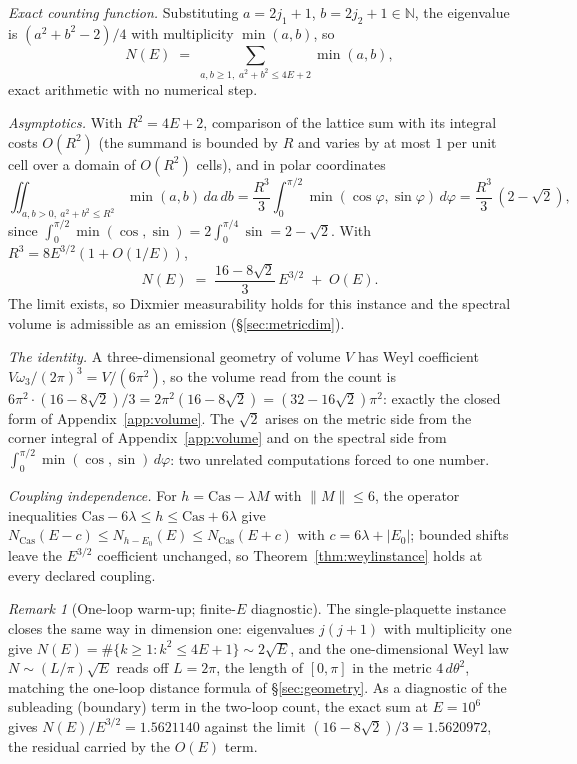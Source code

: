 \documentclass[11pt]{article}
\theoremstyle{definition}
\theoremstyle{remark}
\newtheorem{remark}[theorem]{Remark}
\begin{document}
\emph{Exact counting function.}  Substituting $a = 2j_1{+}1$,
$b = 2j_2{+}1 \in \mathbb N$, the eigenvalue is $(a^2 + b^2 - 2)/4$
with multiplicity $\min(a,b)$, so
\[
N(E) \;=\; \sum_{a,b \ge 1,\; a^2 + b^2 \le 4E + 2} \min(a,b),
\]
exact arithmetic with no numerical step.

\emph{Asymptotics.}  With $R^2 = 4E + 2$, comparison of the lattice sum
with its integral costs $O(R^2)$ (the summand is bounded by $R$ and
varies by at most $1$ per unit cell over a domain of $O(R^2)$ cells),
and in polar coordinates
\[
\iint_{a,b > 0,\ a^2+b^2 \le R^2} \min(a,b)\, da\, db
= \frac{R^3}{3}\int_0^{\pi/2} \min(\cos\varphi, \sin\varphi)\, d\varphi
= \frac{R^3}{3}\,(2 - \sqrt2),
\]
since $\int_0^{\pi/2}\min(\cos,\sin) = 2\int_0^{\pi/4}\sin = 2 -
\sqrt2$.  With $R^3 = 8E^{3/2}(1 + O(1/E))$,
\[
N(E) \;=\; \frac{16 - 8\sqrt2}{3}\, E^{3/2} \;+\; O(E).
\]
The limit exists, so Dixmier measurability holds for this instance and
the spectral volume is admissible as an emission
(\S\ref{sec:metricdim}).

\emph{The identity.}  A three-dimensional geometry of volume $V$ has
Weyl coefficient $V \omega_3/(2\pi)^3 = V/(6\pi^2)$, so the volume read
from the count is $6\pi^2 \cdot (16 - 8\sqrt2)/3 = 2\pi^2(16 -
8\sqrt2) = (32 - 16\sqrt2)\pi^2$: exactly the closed form of
Appendix~\ref{app:volume}.  The $\sqrt2$ arises on the metric side
from the corner integral of Appendix~\ref{app:volume} and on the
spectral side from $\int_0^{\pi/2}\min(\cos,\sin)\,d\varphi$: two
unrelated computations forced to one number.

\emph{Coupling independence.}  For $h = \mathrm{Cas} - \lambda M$ with
$\|M\| \le 6$, the operator inequalities $\mathrm{Cas} - 6\lambda \le
h \le \mathrm{Cas} + 6\lambda$ give $N_{\mathrm{Cas}}(E - c) \le
N_{h - E_0}(E) \le N_{\mathrm{Cas}}(E + c)$ with $c = 6\lambda +
|E_0|$; bounded shifts leave the $E^{3/2}$ coefficient unchanged, so
Theorem~\ref{thm:weylinstance} holds at every declared coupling.

\begin{remark}[One-loop warm-up; finite-$E$ diagnostic]
\label{rem:weylnumerics}
The single-plaquette instance closes the same way in dimension one:
eigenvalues $j(j{+}1)$ with multiplicity one give $N(E) = \#\{k \ge 1 :
k^2 \le 4E{+}1\} \sim 2\sqrt E$, and the one-dimensional Weyl law
$N \sim (L/\pi)\sqrt E$ reads off $L = 2\pi$, the length of $[0,\pi]$
in the metric $4\,d\theta^2$, matching the one-loop distance formula of
\S\ref{sec:geometry}.  As a diagnostic of the subleading (boundary)
term in the two-loop count, the exact sum at $E = 10^6$ gives
$N(E)/E^{3/2} = 1.5621140$ against the limit $(16-8\sqrt2)/3 =
1.5620972$, the residual carried by the $O(E)$ term.
\end{remark}
\end{document}
